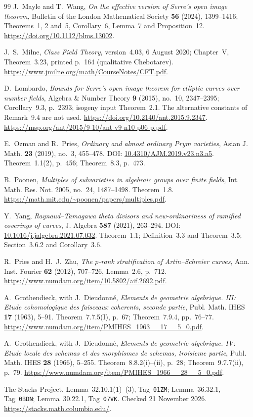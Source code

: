 \documentclass[11pt,a4paper]{article}
\begin{document}
\begin{thebibliography}{99}
J.~Mayle and T.~Wang, \emph{On the effective version of Serre's
open image theorem}, Bulletin of the London Mathematical Society
\textbf{56} (2024), 1399--1416; Theorems~1, 2 and~5,
Corollary~6, Lemma~7 and Proposition~12.
\url{https://doi.org/10.1112/blms.13002}.

J.~S.~Milne, \emph{Class Field Theory}, version~4.03,
6 August 2020; Chapter~V, Theorem~3.23, printed p.~164
(qualitative Chebotarev).
\url{https://www.jmilne.org/math/CourseNotes/CFT.pdf}.

D.~Lombardo, \emph{Bounds for Serre's open image theorem for elliptic
curves over number fields}, Algebra \& Number Theory \textbf{9}
(2015), no.~10, 2347--2395; Corollary~9.3, p.~2393;
isogeny input Theorem~2.1. The alternative constants of Remark~9.4
are not used.
\url{https://doi.org/10.2140/ant.2015.9.2347}.
\url{https://msp.org/ant/2015/9-10/ant-v9-n10-p06-p.pdf}.

E.~Ozman and R.~Pries,
\emph{Ordinary and almost ordinary Prym varieties},
Asian J. Math. \textbf{23} (2019), no.~3, 455--478.
DOI: \href{https://doi.org/10.4310/AJM.2019.v23.n3.a5}{10.4310/AJM.2019.v23.n3.a5}.
Theorem~1.1(2), p.~456; Theorem~8.3, p.~473.

B.~Poonen,
\emph{Multiples of subvarieties in algebraic groups over finite fields},
Int. Math. Res. Not. 2005, no.~24, 1487--1498.
Theorem~1.8.
\url{https://math.mit.edu/~poonen/papers/multiples.pdf}.

Y.~Yang,
\emph{Raynaud--Tamagawa theta divisors and new-ordinariness of
ramified coverings of curves},
J. Algebra \textbf{587} (2021), 263--294.
DOI: \href{https://doi.org/10.1016/j.jalgebra.2021.07.032}{10.1016/j.jalgebra.2021.07.032}.
Theorem~1.1; Definition~3.3 and Theorem~3.5;
Section~3.6.2 and Corollary~3.6.

R.~Pries and H.~J.~Zhu, \emph{The $p$-rank stratification of
Artin--Schreier curves}, Ann. Inst. Fourier \textbf{62} (2012),
707--726, Lemma~2.6, p.~712.
\url{https://www.numdam.org/item/10.5802/aif.2692.pdf}.

A.~Grothendieck, with J.~Dieudonn\'e, \emph{Elements de geometrie
algebrique. III: Etude cohomologique des faisceaux coherents,
seconde partie}, Publ. Math. IHES \textbf{17} (1963), 5--91.
Theorem~7.7.5(I), p.~67; Theorem~7.9.4, pp.~76--77.
\url{https://www.numdam.org/item/PMIHES_1963__17__5_0.pdf}.

A.~Grothendieck, with J.~Dieudonn\'e, \emph{Elements de geometrie
algebrique. IV: Etude locale des schemas et des morphismes de
schemas, troisieme partie}, Publ. Math. IHES \textbf{28} (1966),
5--255. Theorem~8.8.2(i)--(ii), p.~28; Theorem~9.7.7(ii), p.~79.
\url{https://www.numdam.org/item/PMIHES_1966__28__5_0.pdf}.

The Stacks Project, Lemma~32.10.1(1)--(3), Tag~\texttt{01ZM};
Lemma~36.32.1, Tag~\texttt{0BDN}; Lemma~30.22.1,
Tag~\texttt{07VK}. Checked 21 November 2026.
\url{https://stacks.math.columbia.edu/}.

\end{thebibliography}
\end{document}
